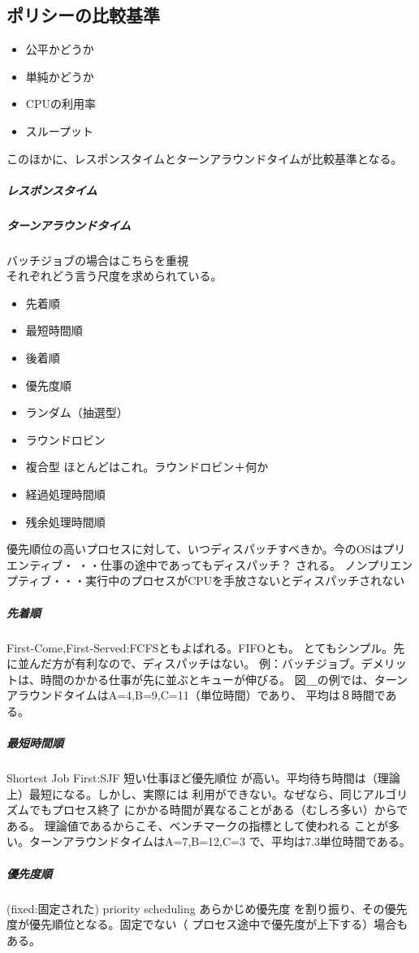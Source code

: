 \documentclass{jsarticle}
\begin{document}
\subsection{ポリシーの比較基準}
\begin{itemize}
  \item 公平かどうか
  \item 単純かどうか
  \item CPUの利用率
  \item スループット
\end{itemize}
このほかに、レスポンスタイムとターンアラウンドタイムが比較基準となる。
\subparagraph{レスポンスタイム}
\subparagraph{ターンアラウンドタイム}
バッチジョブの場合はこちらを重視\\
それぞれどう言う尺度を求められている。\\
\begin{itemize}
  \item 先着順
  \item 最短時間順
  \item 後着順
  \item 優先度順
  \item ランダム（抽選型）
  \item ラウンドロビン
  \item 複合型
  ほとんどはこれ。ラウンドロビン＋何か
  \item 経過処理時間順
  \item 残余処理時間順
\end{itemize}
優先順位の高いプロセスに対して、いつディスパッチすべきか。今のOSはプリエンティブ・
・・仕事の途中であってもディスパッチ？
される。
ノンプリエンプティブ・・・実行中のプロセスがCPUを手放さないとディスパッチされない
\subparagraph{先着順}
First-Come,First-Served:FCFSともよばれる。FIFOとも。
とてもシンプル。先に並んだ方が有利なので、ディスパッチはない。
例：バッチジョブ。デメリットは、時間のかかる仕事が先に並ぶとキューが伸びる。
図＿の例では、ターンアラウンドタイムはA=4,B=9,C=11（単位時間）であり、
平均は８時間である。
\subparagraph{最短時間順}
Shortest Job First:SJF 短い仕事ほど優先順位
が高い。平均待ち時間は（理論上）最短になる。しかし、実際には
利用ができない。なぜなら、同じアルゴリズムでもプロセス終了
にかかる時間が異なることがある（むしろ多い）からである。
理論値であるからこそ、ベンチマークの指標として使われる
ことが多い。ターンアラウンドタイムはA=7,B=12,C=3
で、平均は7.3単位時間である。
\subparagraph{優先度順}
(fixed:固定された) priority scheduling あらかじめ優先度
を割り振り、その優先度が優先順位となる。固定でない（
プロセス途中で優先度が上下する）場合もある。
\end{document}
